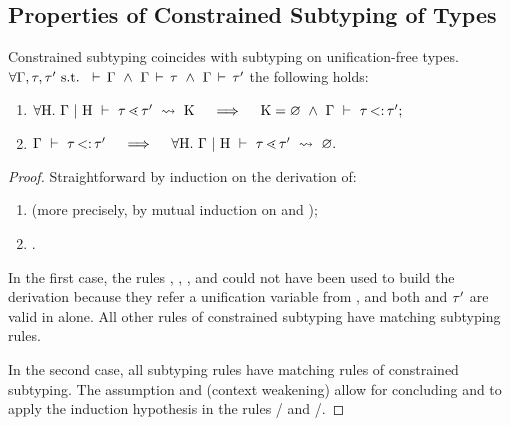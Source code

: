 \subsection{Properties of Constrained Subtyping of Types}%
\label{subsec:props-subtyctr-proof}

\begin{lemma}{Constrained subtyping coincides with subtyping on
    unification-free types.}%
\label{lem:subtyctr-subty}
    $\forall \AEnv, \ty, \ty' \text{ s.t. } 
    \tyvld{}{\AEnv} \ \land\ \tyvlddflt{\ty} \ \land\ \tyvlddflt{\ty'}$ 
    the following holds:
    \begin{enumerate}
        \item $\forall \UEnvD.\ \subtyctrdflt{\ty}{\ty'} \quad\implies\quad
            \CSet = \EmptyCSet\ \land\ \subtydflt{\ty}{\ty'};$
        \item $\subtydflt{\ty}{\ty'} \quad\implies\quad 
            \forall \UEnvD.\ \subtyctrdfltenv{\ty}{\ty'}{\EmptyCSet}.$
    \end{enumerate}
\end{lemma}
\begin{proof}
    Straightforward by induction on the derivation of:
    \begin{enumerate}
        \item {} (more precisely, by mutual induction
            on  and );
        \item {}.
    \end{enumerate}

    In the first case, the rules , , ,
    and  could not have been used to build the derivation
    because they refer a unification variable \va from \UEnvD,
    and both \ty and $\tau'$ are valid in \AEnv alone.
    All other rules of constrained subtyping have matching subtyping rules.

    In the second case, all subtyping rules have matching rules of constrained
    subtyping.
    The assumption \tyvld{}{\AEnv} and  (context
    weakening) allow for concluding 
    \tyvlddflt{\plug\dctx\tyub} and \tyvlddflt{\tylb} 
    to apply the induction hypothesis in the rules
    / and /.
\end{proof}

